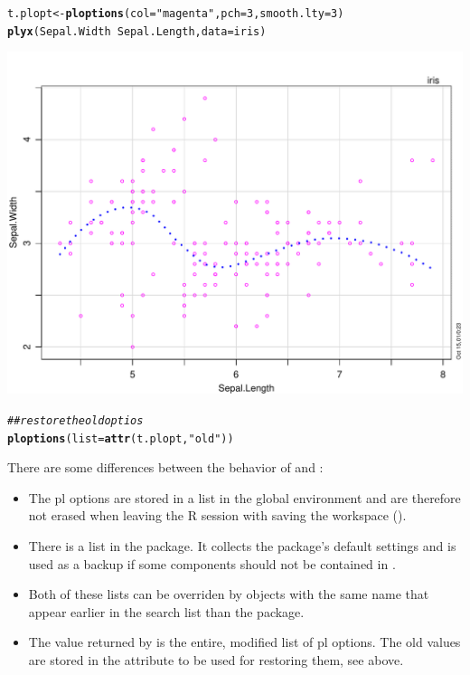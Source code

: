\documentclass[11pt]{article}\usepackage[]{graphicx}\usepackage[]{color}
\makeatletter
\def\maxwidth{ %
  \ifdim\Gin@nat@width>\linewidth
    \linewidth
  \else
    \Gin@nat@width
  \fi
}
\newcommand{\hlnum}[1]{\textcolor[rgb]{0.686,0.059,0.569}{#1}}%
\newcommand{\hlstr}[1]{\textcolor[rgb]{0.192,0.494,0.8}{#1}}%
\newcommand{\hlcom}[1]{\textcolor[rgb]{0.678,0.584,0.686}{\textit{#1}}}%
\newcommand{\hlopt}[1]{\textcolor[rgb]{0,0,0}{#1}}%
\newcommand{\hlstd}[1]{\textcolor[rgb]{0.345,0.345,0.345}{#1}}%
\newcommand{\hlkwb}[1]{\textcolor[rgb]{0.69,0.353,0.396}{#1}}%
\newcommand{\hlkwc}[1]{\textcolor[rgb]{0.333,0.667,0.333}{#1}}%
\newcommand{\hlkwd}[1]{\textcolor[rgb]{0.737,0.353,0.396}{\textbf{#1}}}%
\newenvironment{kframe}{%
 \def\at@end@of@kframe{}%
 \ifinner\ifhmode%
  \def\at@end@of@kframe{\end{minipage}}%
  \begin{minipage}{\columnwidth}%
 \fi\fi%
 \def\FrameCommand##1{\hskip\@totalleftmargin \hskip-\fboxsep
 \colorbox{shadecolor}{##1}\hskip-\fboxsep
     \hskip-\linewidth \hskip-\@totalleftmargin \hskip\columnwidth}%
 \MakeFramed {\advance\hsize-\width
   \@totalleftmargin\z@ \linewidth\hsize
   \@setminipage}}%
 {\par\unskip\endMakeFramed%
 \at@end@of@kframe}
\newenvironment{knitrout}{}{} %
\makeatother
\begin{document}
\begin{knitrout}
\color{fgcolor}\begin{kframe}
\begin{alltt}
\hlstd{t.plopt} \hlkwb{<-} \hlkwd{ploptions}\hlstd{(}\hlkwc{col}\hlstd{=}\hlstr{"magenta"}\hlstd{,} \hlkwc{pch}\hlstd{=}\hlnum{3}\hlstd{,} \hlkwc{smooth.lty}\hlstd{=}\hlnum{3}\hlstd{)}
\hlkwd{plyx}\hlstd{(Sepal.Width}\hlopt{~}\hlstd{Sepal.Length,} \hlkwc{data}\hlstd{=iris)}
\end{alltt}
\end{kframe}
\includegraphics[width=\maxwidth]{figure/ploptions-1} 
\begin{kframe}\begin{alltt}
\hlcom{## restore the old optios}
\hlkwd{ploptions}\hlstd{(}\hlkwc{list}\hlstd{=}\hlkwd{attr}\hlstd{(t.plopt,} \hlstr{"old"}\hlstd{))}
\end{alltt}
\end{kframe}
\end{knitrout}

There are some differences between the behavior of  and :
\begin{itemize}
\item 
The pl options are stored in a list  in the global
environment and are therefore not erased when leaving the R session with
saving the workspace ().
\item
There is a list  in the package. It collects the
package's default settings and is used as a backup if some components should
not be contained in .
\item
Both of these lists can be overriden by objects with the same name
that appear earlier in the search list than the  package.
\item
The value returned by  is the entire, modified list of 
pl options. The old values are stored in the attribute 
to be used for restoring them, see above.
\end{itemize}
\end{document}

